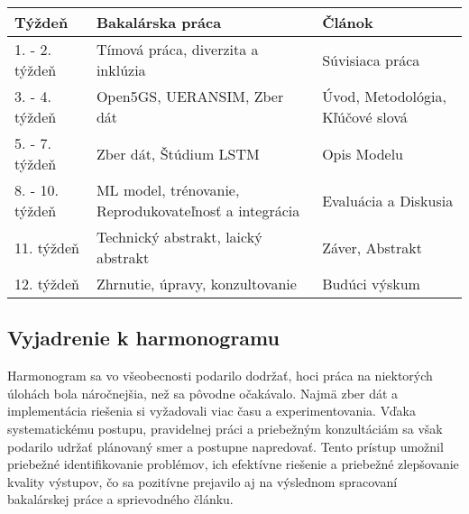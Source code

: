 \begin{tabular}{|p{2.7cm}||p{6.2cm}||p{4.2cm}|}
\hline
Týždeň & Bakalárska práca & Článok \\
\hline
1. - 2. týždeň & Tímová práca, diverzita a inklúzia & Súvisiaca práca  \\
\hline
3. - 4. týždeň & Open5GS, UERANSIM, Zber dát & Úvod, Metodológia, Kľúčové slová \\
\hline
5. - 7.  týždeň  & Zber dát, Štúdium LSTM & Opis Modelu  \\
\hline
8. - 10. týždeň & ML model, trénovanie, Reprodukovateľnosť a integrácia & Evaluácia a Diskusia   \\
\hline
11. týždeň & Technický abstrakt, laický abstrakt & Záver, Abstrakt  \\
\hline
12. týždeň &  Zhrnutie, úpravy, konzultovanie & Budúci výskum \\
\hline
\end{tabular}

\subsection{Vyjadrenie k harmonogramu}
Harmonogram sa vo všeobecnosti podarilo dodržať, hoci práca na niektorých úlohách bola náročnejšia, než sa pôvodne očakávalo. Najmä zber dát a implementácia riešenia si vyžadovali viac času a experimentovania. Vďaka systematickému postupu, pravidelnej práci a priebežným konzultáciám sa však podarilo udržať plánovaný smer a postupne napredovať. Tento prístup umožnil priebežné identifikovanie problémov, ich efektívne riešenie a priebežné zlepšovanie kvality výstupov, čo sa pozitívne prejavilo aj na výslednom spracovaní bakalárskej práce a sprievodného článku.